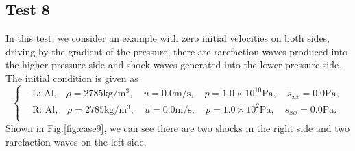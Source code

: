 \documentclass{article}
\numberwithin{equation}{section}
\numberwithin{table}{section}
\begin{document}
\subsection{Test 8}
In this test, we consider an example with zero initial velocities on both sides, driving by the gradient of the pressure, there are rarefaction waves produced into the higher pressure side and shock waves generated into the lower pressure side. The initial condition is given as
\begin{equation}
 \left\{ \begin{aligned}
	 &	 \text{L: Al,}\quad  \rho = 2785 \text{kg}/\text{m}^3, \quad  u = 0.0\text{m}/\text{s}, \quad  p = 1.0\times 10^{10} \text{Pa}, \quad s_{xx}= 0.0 \text{Pa},\\
	 &	 \text{R: Al,}\quad  \rho = 2785 \text{kg}/\text{m}^3, \quad  u = 0.0\text{m}/\text{s}, \quad  p = 1.0 \times 10^2 \text{Pa}, \quad  s_{xx}=0.0\text{Pa}.\\
   \end{aligned}
 \right.
\end{equation}
Shown in Fig.\ref{fig:case9}, we can see there are two shocks in the right side and two rarefaction waves on the left side.
\end{document}
